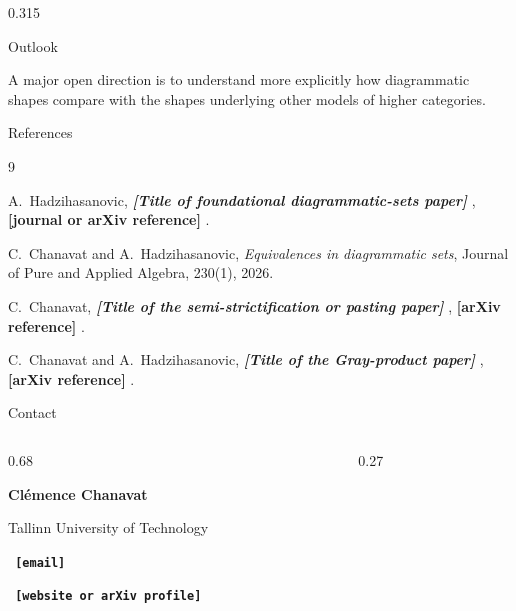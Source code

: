 \documentclass[final]{beamer}
\newcommand{\placeholder}[1]{%
  \textcolor{PosterAccent}{\textbf{[#1]}}%
}
\begin{document}
\begin{frame}[fragile, t]
\begin{columns}[t,totalwidth=\textwidth]
\begin{column}{0.315\textwidth}
\begin{block}{Outlook}
\medskip

A major open direction is to understand more explicitly how
diagrammatic shapes compare with the shapes underlying other models
of higher categories.

\end{block}

\begin{block}{References}

\small

\begin{thebibliography}{9}

A.~Hadzihasanovic,
\newblock \emph{\placeholder{Title of foundational diagrammatic-sets paper}},
\newblock \placeholder{journal or arXiv reference}.

C.~Chanavat and A.~Hadzihasanovic,
\newblock \emph{Equivalences in diagrammatic sets},
\newblock Journal of Pure and Applied Algebra,
230(1), 2026.

C.~Chanavat,
\newblock \emph{\placeholder{Title of the semi-strictification or pasting paper}},
\newblock \placeholder{arXiv reference}.

C.~Chanavat and A.~Hadzihasanovic,
\newblock \emph{\placeholder{Title of the Gray-product paper}},
\newblock \placeholder{arXiv reference}.

\end{thebibliography}

\end{block}

\begin{block}{Contact}

\begin{columns}[c,totalwidth=\linewidth]

\begin{column}{0.68\linewidth}
\large

\textbf{Clémence Chanavat}

\medskip

Tallinn University of Technology

\medskip

\texttt{\placeholder{email}}

\medskip

\texttt{\placeholder{website or arXiv profile}}

\end{column}

\begin{column}{0.27\linewidth}
\centering


\end{column}
\end{columns}
\end{block}
\end{column}
\end{columns}
\end{frame}
\end{document}
